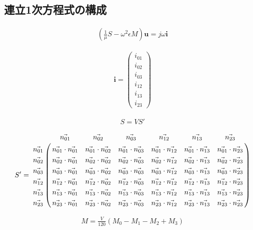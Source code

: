 \subsection{連立1次方程式の構成}

\begin{align}
\left(\frac{1}{\mu}S-\omega^2\epsilon M\right)\bm{u}=j\omega\bm{i}
\end{align}

\begin{align}
\bm{i}=
\left(
\begin{array}{c}i_{01}\\i_{02}\\i_{03}\\i_{12}\\i_{13}\\i_{23}
\end{array}
\right)
\end{align}

\begin{align}
S=VS'
\end{align}

\begin{align}
S'=
\bordermatrix{
&\vec{n_{01}}&\vec{n_{02}}&\vec{n_{03}}
&\vec{n_{12}}&\vec{n_{13}}&\vec{n_{23}}\cr
\vec{n_{01}}
&\vec{n_{01}}\cdot\vec{n_{01}}
&\vec{n_{01}}\cdot\vec{n_{02}}
&\vec{n_{01}}\cdot\vec{n_{03}}
&\vec{n_{01}}\cdot\vec{n_{12}}
&\vec{n_{01}}\cdot\vec{n_{13}}
&\vec{n_{01}}\cdot\vec{n_{23}}\cr
\vec{n_{02}}
&\vec{n_{02}}\cdot\vec{n_{01}}
&\vec{n_{02}}\cdot\vec{n_{02}}
&\vec{n_{02}}\cdot\vec{n_{03}}
&\vec{n_{02}}\cdot\vec{n_{12}}
&\vec{n_{02}}\cdot\vec{n_{13}}
&\vec{n_{02}}\cdot\vec{n_{23}}\cr
\vec{n_{03}}
&\vec{n_{03}}\cdot\vec{n_{01}}
&\vec{n_{03}}\cdot\vec{n_{02}}
&\vec{n_{03}}\cdot\vec{n_{03}}
&\vec{n_{03}}\cdot\vec{n_{12}}
&\vec{n_{03}}\cdot\vec{n_{13}}
&\vec{n_{03}}\cdot\vec{n_{23}}\cr
\vec{n_{12}}
&\vec{n_{12}}\cdot\vec{n_{01}}
&\vec{n_{12}}\cdot\vec{n_{02}}
&\vec{n_{12}}\cdot\vec{n_{03}}
&\vec{n_{12}}\cdot\vec{n_{12}}
&\vec{n_{12}}\cdot\vec{n_{13}}
&\vec{n_{12}}\cdot\vec{n_{23}}\cr
\vec{n_{13}}
&\vec{n_{13}}\cdot\vec{n_{01}}
&\vec{n_{13}}\cdot\vec{n_{02}}
&\vec{n_{13}}\cdot\vec{n_{03}}
&\vec{n_{13}}\cdot\vec{n_{12}}
&\vec{n_{13}}\cdot\vec{n_{13}}
&\vec{n_{13}}\cdot\vec{n_{23}}\cr
\vec{n_{23}}
&\vec{n_{23}}\cdot\vec{n_{01}}
&\vec{n_{23}}\cdot\vec{n_{02}}
&\vec{n_{23}}\cdot\vec{n_{03}}
&\vec{n_{23}}\cdot\vec{n_{12}}
&\vec{n_{23}}\cdot\vec{n_{13}}
&\vec{n_{23}}\cdot\vec{n_{23}}
}
\end{align}

\begin{align}
M=\frac{V}{120}
\left(M_0-M_1-M_2+M_3\right)
\end{align}

